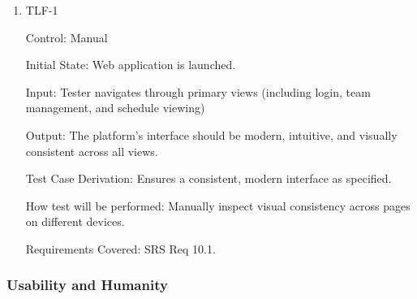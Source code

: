 \documentclass[12pt, titlepage]{article}
\begin{document}
\begin{enumerate}

\item{TLF-1\\}

Control: Manual
					
Initial State: Web application is launched.
					
Input: Tester navigates through primary views (including login, team management, and schedule viewing)
					
Output: The platform’s interface should be modern, intuitive, and visually consistent across all views.

Test Case Derivation: Ensures a consistent, modern interface as specified.
					
How test will be performed: Manually inspect visual consistency across pages on different devices.

Requirements Covered: SRS Req 10.1.

\end{enumerate}

\subsubsection{Usability and Humanity}
\end{document}
